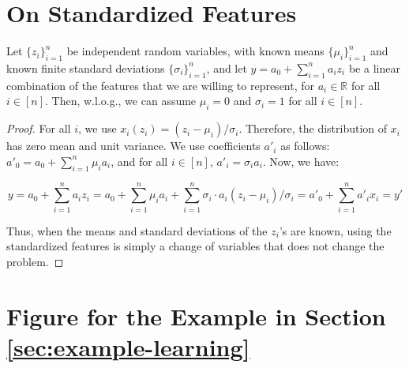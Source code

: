 \section{On Standardized Features} \label{app:general}

\begin{lemma} \label{thm:standardized-ftrs}
    Let $\{z_i\}_{i=1}^n$ be independent random variables, with known means $\{\mu_i\}_{i=1}^n$ and known finite standard deviations $\{\sigma_i\}_{i=1}^n$, and let $y = a_0 + \sum_{i=1}^n a_i z_i$ be a linear combination of the features that we are willing to represent, for $a_i \in 	\mathbb{R}$ for all $i \in [n]$. Then, w.l.o.g., we can assume $\mu_i = 0$ and $\sigma_i = 1$ for all $i \in [n]$.
\end{lemma}

\begin{proof}
    For all $i$, we use $x_i(z_i)=(z_i - \mu_i) / \sigma_i$. Therefore, the distribution of $x_i$ has zero mean and unit variance. 
    We use coefficients $a'_i$ as follows: $a'_0 = a_0 + \sum_{i=1}^n \mu_i a_i$, and for all $i \in [n]$, $a'_i = \sigma_i a_i$.
    Now, we have: 

    $$y =  a_0 + \sum_{i=1}^n a_i z_i = a_0 + \sum_{i=1}^n \mu_i a_i + \sum_{i=1}^n \sigma_i \cdot a_i (z_i - \mu_i) / \sigma_i = a'_0 + \sum_{i=1}^n a'_i x_i = y'$$
    
    Thus, when the means and standard deviations of the $z_i$'s are known, using the standardized features is simply a change of variables that does not change the problem.
    
\end{proof}








\section{Figure for the Example in Section \ref{sec:example-learning}} \label{app:fig-theory-fit-simulation}



